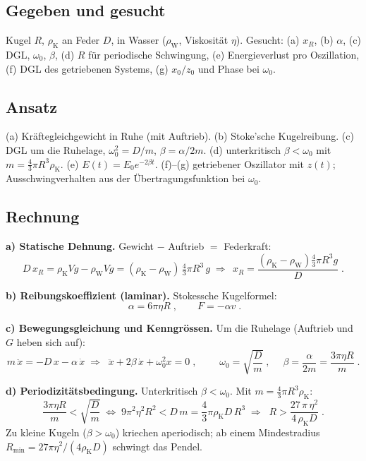 
\subsection*{Gegeben und gesucht}
Kugel $R$, $\rho_{\mathrm K}$ an Feder $D$, in Wasser ($\rho_{\mathrm W}$,
Viskosität $\eta$). Gesucht: (a) $x_R$, (b) $\alpha$, (c) DGL, $\omega_0$,
$\beta$, (d) $R$ für periodische Schwingung, (e) Energieverlust pro Oszillation,
(f) DGL des getriebenen Systems, (g) $x_0/z_0$ und Phase bei $\omega_0$.

\subsection*{Ansatz}
(a) Kräftegleichgewicht in Ruhe (mit Auftrieb). (b) Stoke'sche Kugelreibung.
(c) DGL um die Ruhelage, $\omega_0^2=D/m$, $\beta=\alpha/2m$. (d) unterkritisch
$\beta<\omega_0$ mit $m=\frac43\pi R^3\rho_{\mathrm K}$. (e) $E(t)=E_0e^{-2\beta t}$.
(f)--(g) getriebener Oszillator mit $z(t)$; Ausschwingverhalten aus der
Übertragungsfunktion bei $\omega_0$.

\subsection*{Rechnung}
\textbf{a) Statische Dehnung.} Gewicht $-$ Auftrieb $=$ Federkraft:
\begin{equation}
  D\,x_R=\rho_{\mathrm K}Vg-\rho_{\mathrm W}Vg
  =(\rho_{\mathrm K}-\rho_{\mathrm W})\,\tfrac43\pi R^3\,g
  \;\Rightarrow\;\boxed{\,x_R=\frac{(\rho_{\mathrm K}-\rho_{\mathrm W})\tfrac43\pi R^3 g}{D}\;}.
\end{equation}

\textbf{b) Reibungskoeffizient (laminar).} Stokessche Kugelformel:
\begin{equation}
  \boxed{\;\alpha=6\pi\eta R\;},\qquad F=-\alpha v\;.
\end{equation}

\textbf{c) Bewegungsgleichung und Kenngrössen.} Um die Ruhelage (Auftrieb und
$G$ heben sich auf):
\begin{equation}
  m\,\ddot x=-D\,x-\alpha\,\dot x
  \;\Rightarrow\;
  \boxed{\;\ddot x+2\beta\,\dot x+\omega_0^2 x=0\;},
  \qquad
  \boxed{\;\omega_0=\sqrt{\frac{D}{m}}\;},\quad
  \boxed{\;\beta=\frac{\alpha}{2m}=\frac{3\pi\eta R}{m}\;}.
\end{equation}

\textbf{d) Periodizitätsbedingung.} Unterkritisch $\beta<\omega_0$. Mit
$m=\frac43\pi R^3\rho_{\mathrm K}$:
\begin{equation}
  \frac{3\pi\eta R}{m}<\sqrt{\frac{D}{m}}
  \;\Longleftrightarrow\;
  9\pi^2\eta^2 R^2<D\,m=\frac43\pi\rho_{\mathrm K}D\,R^3
  \;\Rightarrow\;
  \boxed{\;R>\frac{27\,\pi\,\eta^2}{4\,\rho_{\mathrm K}D}\;}.
\end{equation}
Zu kleine Kugeln ($\beta>\omega_0$) kriechen aperiodisch; ab einem
Mindestradius $R_{\min}=27\pi\eta^2/(4\rho_{\mathrm K}D)$ schwingt das Pendel.

